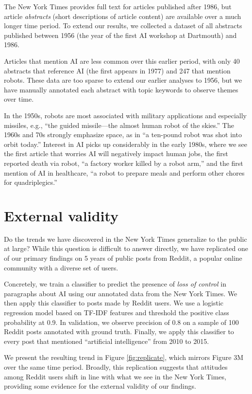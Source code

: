 \documentclass[letterpaper]{article}
\begin{document}
The New York Times provides full text for articles published after 1986, but article \textit{abstracts} (short descriptions of article content) are available over a much longer time period. To extend our results, we collected a dataset of all abstracts published between 1956 (the year of the first AI workshop at Dartmouth) and 1986.

Articles that mention AI are less common over this earlier period, with only 40 abstracts that reference AI (the first appears in 1977) and 247 that mention robots. These data are too sparse to extend our earlier analyses to 1956, but we have manually annotated each abstract with topic keywords to observe themes over time.  

In the 1950s, robots are most associated with military applications and especially missiles, e.g., ``the guided missile---the almost human robot of the skies.'' The 1960s and 70s strongly emphasize space, as in ``a ten-pound robot was shot into orbit today.'' Interest in AI picks up considerably in the early 1980s, where we see the first article that worries AI will negatively impact human jobs, the first reported death via robot, ``a factory worker killed by a robot arm,'' and the first mention of AI in healthcare, ``a robot to prepare meals and perform other chores for quadriplegics.''

\section{External validity}

Do the trends we have discovered in the New York Times generalize to the public at large? While this question is difficult to answer directly, we have replicated one of our primary findings on 5 years of public posts from Reddit, a popular online community with a diverse set of users. 

Concretely, we train a classifier to predict the presence of \textit{loss of control} in paragraphs about AI using our annotated data from the New York Times. We then apply this classifier to posts made by Reddit users. We use a logistic regression model based on TF-IDF features and threshold the positive class probability at 0.9. In validation, we observe precision of 0.8 on a sample of 100 Reddit posts annotated with ground truth. Finally, we apply this classifier to every post that mentioned ``artificial intelligence'' from 2010 to 2015.

We present the resulting trend in Figure \ref{fig:replicate}, which mirrors Figure 3M over the same time period. Broadly, this replication suggests that attitudes among Reddit users shift in line with what we see in the New York Times, providing some evidence for the external validity of our findings.
\end{document}
